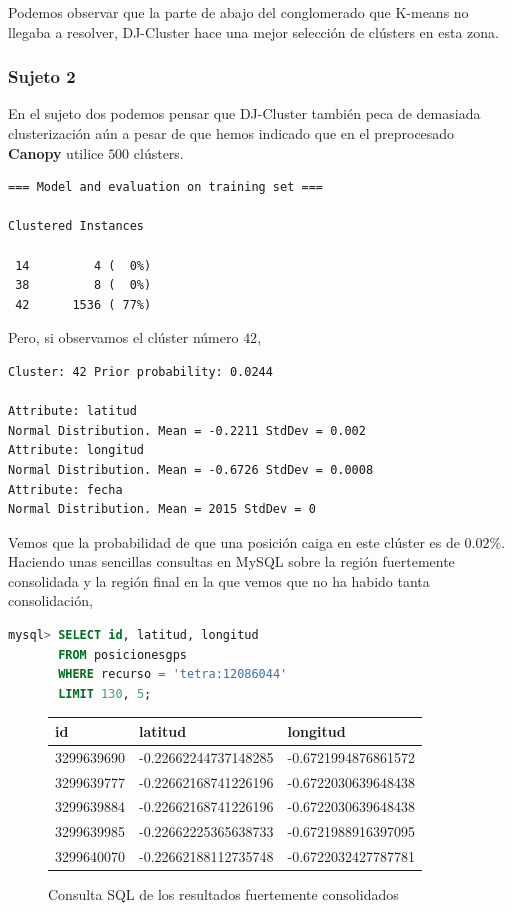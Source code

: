 \documentclass[a4paper, 12pt]{article}
\begin{document}
Podemos observar que la parte de abajo del conglomerado que K-means no llegaba a resolver, DJ-Cluster hace una mejor selecci\'on de cl\'usters en esta zona. \\

\subsubsection{Sujeto 2}

En el sujeto dos podemos pensar que DJ-Cluster tambi\'en peca de demasiada clusterizaci\'on a\'un a pesar de que hemos indicado que en el preprocesado \textbf{Canopy} utilice $500$ cl\'usters.\\

\begin{verbatim}
=== Model and evaluation on training set ===

Clustered Instances

 14         4 (  0%)
 38         8 (  0%)
 42      1536 ( 77%)
\end{verbatim}

Pero, si observamos el cl\'uster n\'umero $42$,\\

\begin{verbatim}
Cluster: 42 Prior probability: 0.0244

Attribute: latitud
Normal Distribution. Mean = -0.2211 StdDev = 0.002
Attribute: longitud
Normal Distribution. Mean = -0.6726 StdDev = 0.0008
Attribute: fecha
Normal Distribution. Mean = 2015 StdDev = 0
\end{verbatim}

Vemos que la probabilidad de que una posici\'on caiga en este cl\'uster es de $0.02\%$. Haciendo unas sencillas consultas en MySQL sobre la regi\'on fuertemente consolidada y la regi\'on final en la que vemos que no ha habido tanta consolidaci\'on,

\begin{lstlisting}[language=sql, columns=fullflexible, basicstyle=\small, frame=tbrl, showstringspaces=false]
mysql> SELECT id, latitud, longitud 
	   FROM posicionesgps 
	   WHERE recurso = 'tetra:12086044' 
	   LIMIT 130, 5;
\end{lstlisting}

\begin{figure}[H]
	\begin{tabular}{| l | l | l |}
	\hline
	\rowcolor{LightCyan}
	\hline
  		id & latitud & longitud \\
	\hline
		3299639690 & -0.22662244737148285 & -0.6721994876861572 \\
		3299639777 & -0.22662168741226196 & -0.6722030639648438 \\
		3299639884 & -0.22662168741226196 & -0.6722030639648438 \\
		3299639985 & -0.22662225365638733 & -0.6721988916397095 \\
		3299640070 & -0.22662188112735748 & -0.6722032427787781 \\
	\hline
	\end{tabular}
	\caption{Consulta SQL de los resultados fuertemente consolidados}
\end{figure}
\end{document}
